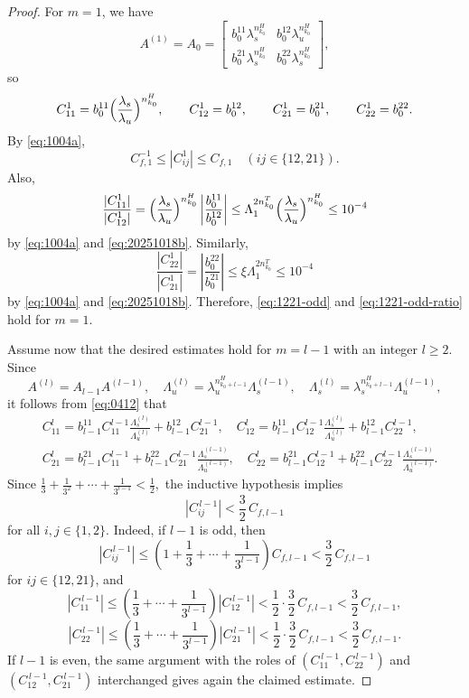 \documentclass[10pt,a4paper]{amsart}
\begin{document}
\begin{proof}
For $m=1$, we have
\[
A^{(1)}=A_0=
\begin{bmatrix}
b_0^{11}\lambda_s^{n_{k_0}^H} & b_0^{12}\lambda_u^{n_{k_0}^H}\\
b_0^{21}\lambda_s^{n_{k_0}^H} & b_0^{22}\lambda_s^{n_{k_0}^H}
\end{bmatrix},
\]
so
\[
C_{11}^1=b_0^{11}\Bigl(\frac{\lambda_s}{\lambda_u}\Bigr)^{n_{k_0}^H},
\qquad
C_{12}^1=b_0^{12},
\qquad
C_{21}^1=b_0^{21},
\qquad
C_{22}^1=b_0^{22}.
\]
By \eqref{eq:1004a},
\[
C_{f,1}^{-1}\le |C_{ij}^1|\le C_{f,1}\quad (ij\in\{12,21\}).
\]
Also,
\[
\frac{|C_{11}^1|}{|C_{12}^1|}
=
\Bigl(\frac{\lambda_s}{\lambda_u}\Bigr)^{n_{k_0}^H}
\left|\frac{b_0^{11}}{b_0^{12}}\right|
\le
\Lambda_1^{2n_{k_0}^T}
\Bigl(\frac{\lambda_s}{\lambda_u}\Bigr)^{n_{k_0}^H}
\le 10^{-4}
\]
by \eqref{eq:1004a} and \eqref{eq:20251018b}. Similarly,
\[
\frac{|C_{22}^1|}{|C_{21}^1|}
=
\left|\frac{b_0^{22}}{b_0^{21}}\right|
\le
\xi \Lambda_1^{2n_{k_0}^T}
\le 10^{-4}
\]
by \eqref{eq:1004a} and \eqref{eq:20251018b}. 
Therefore, \eqref{eq:1221-odd} and \eqref{eq:1221-odd-ratio} hold for $m=1$.

Assume now that the desired estimates hold for $m=l-1$ with an integer $l\ge 2$.
Since
\[
A^{(l)}=A_{l-1}A^{(l-1)},
\quad
\Lambda_u^{(l)}=\lambda_u^{n_{k_0+l-1}^H}\Lambda_s^{(l-1)},
\quad
\Lambda_s^{(l)}=\lambda_s^{n_{k_0+l-1}^H}\Lambda_u^{(l-1)},
\]
it follows from \eqref{eq:0412} that
\begin{align*}
&C_{11}^{l}
=b_{l-1}^{11}C_{11}^{l-1}\frac{\Lambda_s^{(l)}}{\Lambda_u^{(l)}}+b_{l-1}^{12}C_{21}^{l-1},\quad
C_{12}^{l}
=b_{l-1}^{11}C_{12}^{l-1}\frac{\Lambda_s^{(l)}}{\Lambda_u^{(l)}}+b_{l-1}^{12}C_{22}^{l-1},\\
&C_{21}^{l}
=b_{l-1}^{21}C_{11}^{l-1}+b_{l-1}^{22}C_{21}^{l-1}\frac{\Lambda_s^{(l-1)}}{\Lambda_u^{(l-1)}},\quad
C_{22}^{l}
=b_{l-1}^{21}C_{12}^{l-1}+b_{l-1}^{22}C_{22}^{l-1}\frac{\Lambda_s^{(l-1)}}{\Lambda_u^{(l-1)}}.
\end{align*}
Since
$
\frac{1}{3}+\frac{1}{3^2}+\cdots +\frac{1}{3^{l-1}}<\frac12,
$
the inductive hypothesis implies
\[
|C_{ij}^{\,l-1}|<\frac32\,C_{f,l-1}
\]
for all $i,j\in\{1,2\}$.
Indeed, if $l-1$ is odd, then
\[
|C_{ij}^{\,l-1}|
\le
\left(1+\frac{1}{3}+\cdots +\frac{1}{3^{l-1}}\right)C_{f,l-1}
<
\frac32\,C_{f,l-1}
\]
for $ij\in\{12,21\}$,
and
\[
|C_{11}^{\,l-1}|
\le
\left(\frac{1}{3}+\cdots +\frac{1}{3^{l-1}}\right)|C_{12}^{\,l-1}|
<
\frac12\cdot\frac32\,C_{f,l-1}
<
\frac32\,C_{f,l-1},
\]
\[
|C_{22}^{\,l-1}|
\le
\left(\frac{1}{3}+\cdots +\frac{1}{3^{l-1}}\right)|C_{21}^{\,l-1}|
<
\frac12\cdot\frac32\,C_{f,l-1}
<
\frac32\,C_{f,l-1}.
\]
If $l-1$ is even, the same argument with the roles of
$(C_{11}^{\,l-1},C_{22}^{\,l-1})$ and $(C_{12}^{\,l-1},C_{21}^{\,l-1})$
interchanged gives again the claimed estimate.


\end{proof}
\end{document}
